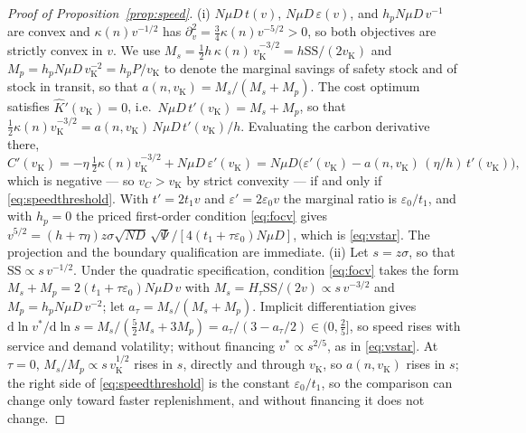 \documentclass[11pt]{article}
\numberwithin{proposition}{section}
\theoremstyle{definition}
\theoremstyle{remark}
\theoremstyle{plain}
\newcommand{\sstock}{\mathrm{SS}}
\begin{document}
\begin{proof}[Proof of Proposition~\ref{prop:speed}]
(i) $N\mu D\,t(v)$, $N\mu D\,\varepsilon(v)$, and $h_pN\mu D\,v^{-1}$ are convex and $\kappa(n)v^{-1/2}$ has
$\partial_v^2=\tfrac34 \kappa(n)v^{-5/2}>0$, so both objectives are strictly convex in $v$. We use
$M_s=\tfrac12 h\,\kappa(n)\,v_{\mathrm K}^{-3/2}=h\sstock/(2v_{\mathrm K})$ and
$M_p=h_pN\mu D\,v_{\mathrm K}^{-2}=h_pP/v_{\mathrm K}$ to denote the marginal savings of safety stock and of stock
in transit, so that $a(n,v_{\mathrm K})=M_s/(M_s+M_p)$. The cost optimum
satisfies $\hat K'(v_{\mathrm K})=0$, i.e.\ $N\mu D\,t'(v_{\mathrm K})=M_s+M_p$, so that
$\tfrac12 \kappa(n)v_{\mathrm K}^{-3/2}=a(n,v_{\mathrm K})\,N\mu D\,t'(v_{\mathrm K})/h$. Evaluating the carbon
derivative there,
\[
  \hat C'(v_{\mathrm K})=-\eta\,\tfrac12 \kappa(n)v_{\mathrm K}^{-3/2}+N\mu D\,\varepsilon'(v_{\mathrm K})
  =N\mu D\big(\varepsilon'(v_{\mathrm K})-a(n,v_{\mathrm K})\,(\eta/h)\,t'(v_{\mathrm K})\big),
\]
which is negative --- so $v_C>v_{\mathrm K}$ by strict convexity --- if and only if \eqref{eq:speedthreshold}.
With $t'=2t_1 v$ and $\varepsilon'=2\varepsilon_0 v$ the marginal ratio is $\varepsilon_0/t_1$, and with $h_p=0$
the priced first-order condition \eqref{eq:focv} gives
$v^{5/2}=(h+\tau\eta)z\sigma\sqrt{ND}\,\sqrt{\Psi}/[4(t_1+\tau\varepsilon_0)N\mu D]$, which is
\eqref{eq:vstar}. The projection and the boundary qualification are immediate.
(ii) Let $s=z\sigma$, so that $\sstock\propto s\,v^{-1/2}$. Under the quadratic specification, condition
\eqref{eq:focv} takes the form $M_s+M_p=2(t_1+\tau\varepsilon_0)N\mu D\,v$ with $M_s=H_\tau\sstock/(2v)\propto
s\,v^{-3/2}$ and $M_p=h_pN\mu D\,v^{-2}$; let $a_\tau=M_s/(M_s+M_p)$. Implicit differentiation gives
$\mathrm d\ln v^*/\mathrm d\ln s=M_s/(\tfrac52M_s+3M_p)=a_\tau/(3-a_\tau/2)\in(0,\tfrac25]$, so speed rises with
service and demand volatility; without financing $v^*\propto s^{2/5}$, as in \eqref{eq:vstar}. At $\tau=0$,
$M_s/M_p\propto s\,v_{\mathrm K}^{1/2}$ rises in $s$, directly and through $v_{\mathrm K}$, so $a(n,v_{\mathrm K})$
rises in $s$; the right side of \eqref{eq:speedthreshold} is the constant $\varepsilon_0/t_1$, so the comparison
can change only toward faster replenishment, and without financing it does not change.
\end{proof}
\end{document}
